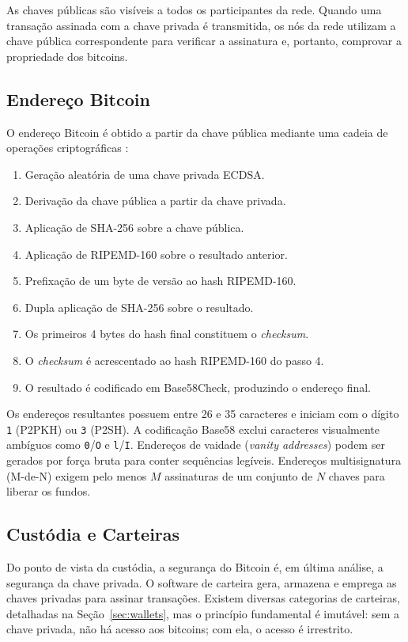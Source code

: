 \documentclass[12pt,a4paper]{report}
\begin{document}
As chaves públicas são visíveis a todos os participantes da rede. Quando uma transação assinada com a chave privada é transmitida, os nós da rede utilizam a chave pública correspondente para verificar a assinatura e, portanto, comprovar a propriedade dos bitcoins.

\subsection{Endereço Bitcoin}

O endereço Bitcoin é obtido a partir da chave pública mediante uma cadeia de operações criptográficas \cite{Bashir2023}:

\begin{enumerate}
    \item Geração aleatória de uma chave privada ECDSA.
    \item Derivação da chave pública a partir da chave privada.
    \item Aplicação de SHA-256 sobre a chave pública.
    \item Aplicação de RIPEMD-160 sobre o resultado anterior.
    \item Prefixação de um byte de versão ao hash RIPEMD-160.
    \item Dupla aplicação de SHA-256 sobre o resultado.
    \item Os primeiros 4 bytes do hash final constituem o \textit{checksum}.
    \item O \textit{checksum} é acrescentado ao hash RIPEMD-160 do passo 4.
    \item O resultado é codificado em Base58Check, produzindo o endereço final.
\end{enumerate}

Os endereços resultantes possuem entre 26 e 35 caracteres e iniciam com o dígito \texttt{1} (P2PKH) ou \texttt{3} (P2SH). A codificação Base58 exclui caracteres visualmente ambíguos como \texttt{0}/\texttt{O} e \texttt{l}/\texttt{I}. Endereços de vaidade (\textit{vanity addresses}) podem ser gerados por força bruta para conter sequências legíveis. Endereços multisignatura (M-de-N) exigem pelo menos $M$ assinaturas de um conjunto de $N$ chaves para liberar os fundos.

\subsection{Custódia e Carteiras}

Do ponto de vista da custódia, a segurança do Bitcoin é, em última análise, a segurança da chave privada. O software de carteira gera, armazena e emprega as chaves privadas para assinar transações. Existem diversas categorias de carteiras, detalhadas na Seção~\ref{sec:wallets}, mas o princípio fundamental é imutável: sem a chave privada, não há acesso aos bitcoins; com ela, o acesso é irrestrito.
\end{document}
